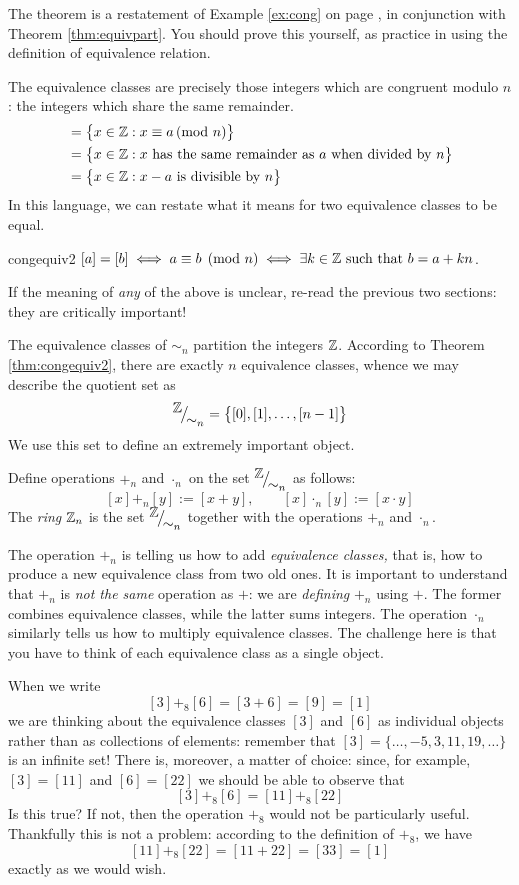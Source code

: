 The theorem is a restatement of Example \ref{ex:cong} on page \pageref{ex:cong}, in conjunction with Theorem \ref{thm:equivpart}. You should prove this yourself, as practice in using the definition of equivalence relation.\par
The equivalence classes are precisely those integers which are congruent modulo $n$: the integers which share the same remainder.
\begin{align*}
	[a]&=\big\{x\in\Z:x\equiv a\spmod n\big\}\\
	&=\big\{x\in\Z:x\text{ has the same remainder as $a$ when divided by $n$}\big\}\\
	&=\big\{x\in\Z:x-a\text{ is divisible by $n$}\big\}
\end{align*}
In this language, we can restate what it means for two equivalence classes to be equal.

\begin{thm}{}{congequiv2}
	$[a]=[b]\iff a\equiv b\pmod n\iff \exists k\in\mathbb{Z}\text{ such that }b=a+kn$.
\end{thm}

If the meaning of \emph{any} of the above is unclear, re-read the previous two sections: they are critically important!\par
The equivalence classes of $\sim_n$ partition the integers $\mathbb{Z}$. According to Theorem \ref{thm:congequiv2}, there are exactly $n$ equivalence classes, whence we may describe the quotient set as
\[
	{}^{\textstyle {\mathbb{Z}}}\!\big/_{\textstyle \!{\sim_n}}=\big\{[0],[1],\ldots,[n-1]\big\}
\]
We use this set to define an extremely important object.

\begin{defn}{}{}
	Define operations $+_n$ and $\cdot_n$ on the set ${}^{\textstyle {\mathbb{Z}}}\!\big/_{\textstyle \!{\sim_n}}$ as follows:
	\[
		[x]+_n[y]:=[x+y],\qquad [x]\cdot_n[y]:=[x\cdot y]
	\]
	The \emph{ring} $\mathbb{Z}_n$ is the set ${}^{\textstyle {\mathbb{Z}}}\!\big/_{\textstyle \!{\sim_n}}$ together with the operations $+_n$ and $\cdot_n$.
\end{defn}

The operation $+_n$ is telling us how to add \emph{equivalence classes,} that is, how to produce a new equivalence class from two old ones. It is important to understand that $+_n$ is \emph{not the same} operation as $+$: we are \emph{defining} $+_n$ using $+$. The former combines equivalence classes, while the latter sums integers. The operation $\cdot_n$ similarly tells us how to multiply equivalence classes. The challenge here is that you have to think of each equivalence class as a single object. 

\begin{example}{}{}
	When we write
	\[
		[3]+_8[6]=[3+6]=[9]=[1]
	\]
	we are thinking about the equivalence classes $[3]$ and $[6]$ as individual objects rather than as collections of elements: remember that $[3]=\{\ldots,-5,3,11,19,\ldots\}$ is an infinite set! There is, moreover, a matter of choice: since, for example, $[3]=[11]$ and $[6]=[22]$ we should be able to observe that
	\[
		[3]+_8[6]=[11]+_8[22]
	\]
	Is this true? If not, then the operation $+_8$ would not be particularly useful. Thankfully this is not a problem: according to the definition of $+_8$, we have
	\[
		[11]+_8[22]=[11+22]=[33]=[1]
	\]
	exactly as we would wish.
\end{example}

